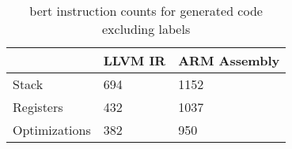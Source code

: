\begin{table}[h!]
\centering
\begin{tabular}{p{}p{}p{}}
  \hline
 & LLVM IR & ARM Assembly \\ 
  \hline
Stack & 694 & 1152 \\ 
  Registers & 432 & 1037 \\ 
  Optimizations & 382 & 950 \\ 
   \hline
\end{tabular}
\caption{bert instruction counts for generated code excluding labels}
\end{table}

